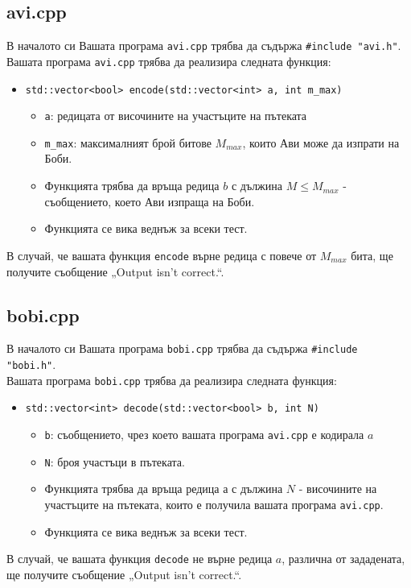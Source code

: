 \documentclass[a4paper,11pt]{article}
\newcommand{\code}[1]{\texttt{#1}}
\newcommand{\noskip}{\vspace{-\parskip}}
\begin{document}
\subsection*{avi.cpp}
\noskip
В началото си Вашата програма \code{avi.cpp} трябва да съдържа 
\code{\#include "avi.h"}.\\
Вашата програма \code{avi.cpp} трябва да реализира следната функция:
\noskip
\begin{itemize}
    \item \code{std::vector<bool> encode(std::vector<int> a, int m\_max)}
    \begin{itemize}
        \item \code{a}: редицата от височините на участъците на пътеката
        \item \code{m\_max}: максималният брой битове $M_{max}$, които Ави може
            да изпрати на Боби.
        \item Функцията трябва да връща редица $b$ с дължина $M \leq M_{max}$ -
            съобщението, което Ави изпраща на Боби.
        \item Функцията се вика веднъж за всеки тест.
    \end{itemize}
\end{itemize}

В случай, че вашата функция \code{encode} върне редица с повече от $M_{max}$
бита, ще получите съобщение „Output isn’t correct.“.

\noskip
\subsection*{bobi.cpp}
\noskip
В началото си Вашата програма \code{bobi.cpp} трябва да съдържа 
\code{\#include "bobi.h"}.\\
Вашата програма \code{bobi.cpp} трябва да реализира следната функция:
\noskip
\begin{itemize}
    \item \code{std::vector<int> decode(std::vector<bool> b, int N)}
    \begin{itemize}
        \item \code{b}: съобщението, чрез което вашата програма \code{avi.cpp}
            е кодирала $a$
        \item \code{N}: броя участъци в пътеката.
        \item Функцията трябва да връща редица $а$ с дължина $N$ - височините
            на участъците на пътеката, които е получила вашата програма
            \code{avi.cpp}.
        \item Функцията се вика веднъж за всеки тест.
    \end{itemize}
\end{itemize}
В случай, че вашата функция \code{decode} не върне редица $a$, различна от
зададената, ще получите съобщение „Output isn’t correct.“.
\end{document}
